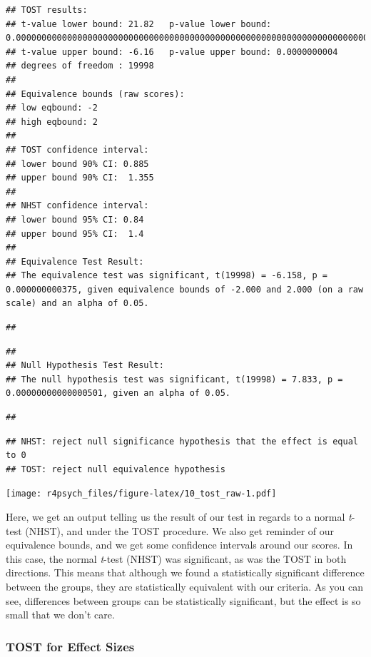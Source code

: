 \documentclass[
]{book}
\begin{document}
\begin{verbatim}
## TOST results:
## t-value lower bound: 21.82   p-value lower bound: 0.00000000000000000000000000000000000000000000000000000000000000000000000000000000000000000000000000000001
## t-value upper bound: -6.16   p-value upper bound: 0.0000000004
## degrees of freedom : 19998
## 
## Equivalence bounds (raw scores):
## low eqbound: -2 
## high eqbound: 2
## 
## TOST confidence interval:
## lower bound 90% CI: 0.885
## upper bound 90% CI:  1.355
## 
## NHST confidence interval:
## lower bound 95% CI: 0.84
## upper bound 95% CI:  1.4
## 
## Equivalence Test Result:
## The equivalence test was significant, t(19998) = -6.158, p = 0.000000000375, given equivalence bounds of -2.000 and 2.000 (on a raw scale) and an alpha of 0.05.
\end{verbatim}

\begin{verbatim}
## 
\end{verbatim}

\begin{verbatim}
## 
## Null Hypothesis Test Result:
## The null hypothesis test was significant, t(19998) = 7.833, p = 0.00000000000000501, given an alpha of 0.05.
\end{verbatim}

\begin{verbatim}
## 
\end{verbatim}

\begin{verbatim}
## NHST: reject null significance hypothesis that the effect is equal to 0 
## TOST: reject null equivalence hypothesis
\end{verbatim}

\texttt{[image: r4psych\_files/figure-latex/10\_tost\_raw-1.pdf]}

Here, we get an output telling us the result of our test in regards to a normal \emph{t}-test (NHST), and under the TOST procedure. We also get reminder of our equivalence bounds, and we get some confidence intervals around our scores. In this case, the normal \emph{t}-test (NHST) was significant, as was the TOST in both directions. This means that although we found a statistically significant difference between the groups, they are statistically equivalent with our criteria. As you can see, differences between groups can be statistically significant, but the effect is so small that we don't care.

\hypertarget{tost-for-effect-sizes}{%
\subsubsection{TOST for Effect Sizes}\label{tost-for-effect-sizes}}
\end{document}
